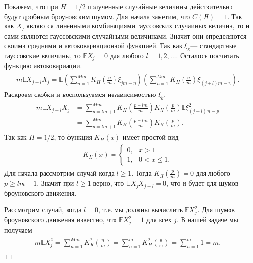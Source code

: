 \documentclass[a4paper,12pt]{article}
\numberwithin{equation}{section}
\begin{document}
	Покажем, что при $H=1/2$ полученные случайные величины действительно будут дробным броуновским шумом. Для начала заметим, что $C(H)=1$. Так как $X_j$ являются линейными комбинациями гауссовских случайных величин, то и сами являются гауссовскими случайными величинами. Значит они определяются своими средними и автоковариационной функцией. Так как $\xi_k$--- стандартные гауссовские величины, то $\mathbb{E}X_j = 0$ для любого $l = 1,2,\ldots$. Осталось посчитать функцию автоковариации.
	\begin{align}
	\begin{split}
	m\mathbb{E}X_{j+l}X_j = \mathbb{E}\left(\sum_{n=1}^{Mm}K_H\left(\frac{n}{m}\right) \xi_{jm-n}\right)\left(\sum_{n=1}^{Mm}K_H\left(\frac{n}{m}\right) \xi_{(j+l)m-n}\right).
	\end{split}
	\end{align}
	Раскроем скобки и воспользуемся независимостью $\xi_k$. 
	\begin{align}
	\begin{split}
	m\mathbb{E}X_{j+l}X_j &= \sum_{p = lm+1}^{Mm}K_H\left(\frac{p-lm}{m}\right)K_H\left(\frac{p}{m}\right)\mathbb{E}\xi_{(j+l)m-p}^2 \\ &= \sum_{p = lm+1}^{Mm}K_H\left(\frac{p-lm}{m}\right)K_H\left(\frac{p}{m}\right).  
	\end{split}
	\end{align}
	Так как $H = 1/2$, то функция $K_H(x)$ имеет простой вид 
	\begin{align}
	\begin{split}
	K_H(x) = 
	\begin{cases}
	0, & x>1\\
	1, & 0<x\leq 1. 
	\end{cases}
	\end{split}
	\end{align}
	Для начала рассмотрим случай когда $l\geq 1$. Тогда $K_H\left(\frac{p}{m}\right) = 0$ для любого $p \geq lm+1$. Значит при $l \geq 1$ верно, что $\mathbb{E}X_jX_{j+l} = 0$, что и будет для шумов броуновского движения. 
	
	Рассмотрим случай, когда $l = 0$, т.е. мы должны вычислить $\mathbb{E}X_j^2$. Для шумов броуновского движения известно, что $\mathbb{E}X_j^2 = 1$ для всех $j$. В нашей задаче мы получаем 
	\begin{align}
	\begin{split}
	m\mathbb{E}X_j^2 =  \sum_{n=1}^{Mm}K_H^2\left(\frac{n}{m}\right) = \sum_{n=1}^{m}K_H^2\left(\frac{n}{m}\right) = \sum_{n=1}^{m}1 = m. 
	\end{split}
	\end{align} 
	$\Box$
	
\end{document}

